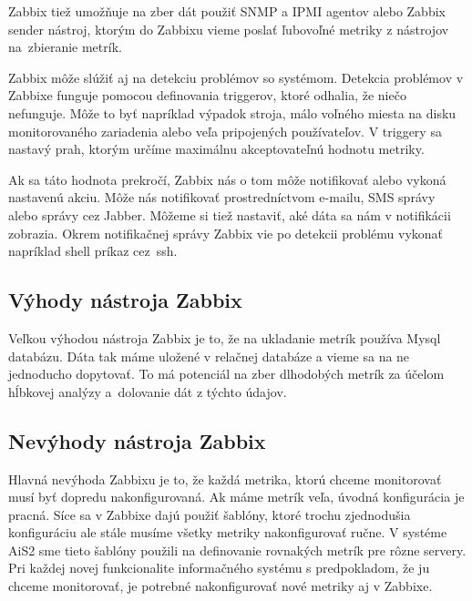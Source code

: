 \documentclass[a4paper, upjsfrontpage, disablespecwarning, thesismargins, thesislinespacing]{rnthesis}
\begin{document}
Zabbix tiež umožňuje na zber dát použiť SNMP a IPMI agentov alebo Zabbix sender nástroj, ktorým do Zabbixu vieme poslať ľubovoľné metriky z nástrojov na~zbieranie metrík.

Zabbix môže slúžiť aj na detekciu problémov so systémom.
Detekcia problémov v Zabbixe funguje pomocou definovania triggerov, ktoré odhalia, že niečo nefunguje.
Môže to byť napríklad výpadok stroja, málo voľného miesta na disku monitorovaného zariadenia alebo veľa pripojených používateľov.
V triggery sa nastavý prah, ktorým určíme maximálnu akceptovateľnú hodnotu metriky.

Ak sa táto hodnota prekročí, Zabbix nás o tom môže notifikovať alebo vykoná nastavenú akciu.
Môže nás notifikovať prostredníctvom e-mailu, SMS správy alebo správy cez Jabber.
Môžeme si tiež nastaviť, aké dáta sa nám v notifikácii zobrazia.
Okrem notifikačnej správy Zabbix vie po detekcii problému vykonať napríklad shell príkaz cez~ssh.

\subsection{Výhody nástroja Zabbix}

Veľkou výhodou nástroja Zabbix je to, že na ukladanie metrík používa Mysql databázu.
Dáta tak máme uložené v relačnej databáze a vieme sa na ne jednoducho dopytovať.
To má potenciál na zber dlhodobých metrík za účelom hĺbkovej analýzy a~dolovanie dát z týchto údajov.


\subsection{Nevýhody nástroja Zabbix}

Hlavná nevýhoda Zabbixu je to, že každá metrika, ktorú chceme monitorovať musí byť dopredu nakonfigurovaná.
Ak máme metrík veľa, úvodná konfigurácia je pracná.
Síce sa v Zabbixe dajú použiť šablóny, ktoré trochu zjednodušia konfiguráciu ale stále musíme všetky metriky nakonfigurovať ručne.
V systéme AiS2 sme tieto šablóny použili na definovanie rovnakých metrík pre rôzne servery.
Pri každej novej funkcionalite informačného systému s predpokladom, že ju chceme monitorovať, je potrebné nakonfigurovať nové metriky aj v Zabbixe.
\end{document}
